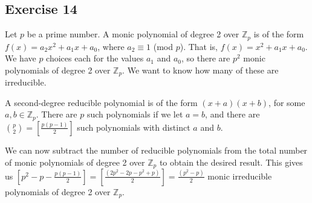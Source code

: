 \subsection*{Exercise 14}
Let $p$ be a prime number. A monic polynomial of degree 2 over $\mathbb{Z}_p$ is of the form $f(x) = a_2x^2 + a_1x + a_0$, where $a_2 \equiv 1$ (mod $p$). That is, $f(x) = x^2 + a_1x + a_0.$ We have $p$ choices each for the values $a_1$ and $a_0$, so there are $p^2$ monic polynomials of degree 2 over $\mathbb{Z}_p$. We want to know how many of these are irreducible.

A second-degree reducible polynomial is of the form $(x + a)(x + b)$, for some $a,b \in \mathbb{Z}_p$. There are $p$ such polynomials if we let $a = b$, and there are $\binom{p}{2} =[\frac{p(p-1)}{2}]$ such polynomials with distinct $a$ and $b$.

We can now subtract the number of reducible polynomials from the total number of monic polynomials of degree 2 over $\mathbb{Z}_p$ to obtain the desired result. This gives us $[p^2 - p - \frac{p(p-1)}{2}] = [\frac{(2p^2 - 2p - p^2 + p)}{2}] = \frac{(p^2 - p)}{2}$ monic irreducible polynomials of degree 2 over $\mathbb{Z}_p$.